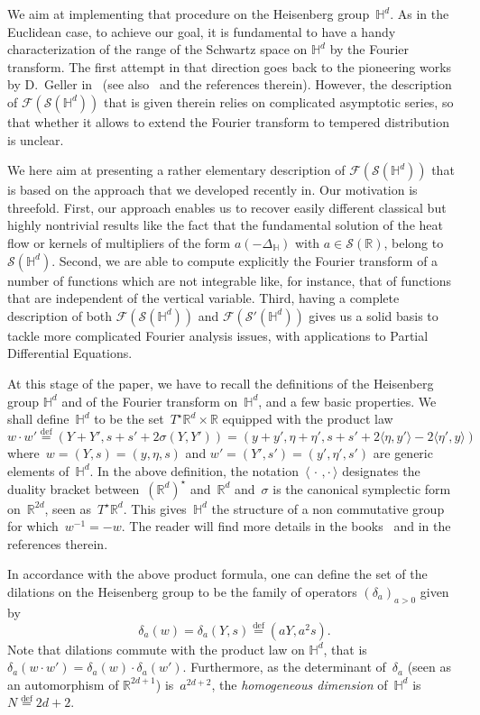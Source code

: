 \documentclass[11pt]{article}
\theoremstyle{definition}
\numberwithin{equation}{section}
\numberwithin{figure}{section}
\numberwithin{table}{section}
\newcommand{\D}{\Delta}
\newcommand*\cF{\mathcal{F}}
\newcommand*\cS{\mathcal{S}}
\newcommand*\R{\mathbb{R}}
\newcommand*\bbH{\mathbb{H}}
\newcommand*\eqdefa{\overset{\mathrm{def}}{=}}
\begin{document}
We aim at implementing that procedure on the Heisenberg group~$\bbH^d$. As in the Euclidean case, to achieve our goal, it is fundamental to have a handy characterization of the range of the Schwartz space on $\bbH^d$ by the Fourier transform. The first attempt in that direction goes back to the pioneering works by D.~Geller in~\cite{geller, geller2} (see also~\cite{astengo2,F,thangavelu2} and the references therein). However, the description of $\cF(\cS(\bbH^d))$ that is given therein relies on complicated asymptotic series, so that whether it allows to extend the Fourier transform to tempered distribution is unclear.

We here aim at presenting a rather elementary description of $\cF(\cS(\bbH^d))$ that is based on the approach that we developed recently in\cite{bcdFHspace}. Our motivation is threefold. First, our approach enables us to recover easily different classical but highly nontrivial results like the fact that the fundamental solution of the heat flow or kernels of multipliers of the form $a(-\D_\bbH)$ with $a\in\cS(\R)$, belong to $\cS(\bbH^d)$. Second, we are able to compute explicitly the Fourier transform of a number of functions which are not integrable like, for instance, that of functions that are independent of the vertical variable. Third, having a complete description of both $\cF(\cS(\bbH^d))$ and $\cF(\cS'(\bbH^d))$ gives us a solid basis to tackle more complicated Fourier analysis issues, with applications to Partial Differential Equations.

At this stage of the paper, we have to recall the definitions of the Heisenberg group $\bbH^d$ and of the Fourier transform on~$\bbH^d$, and a few basic properties. We shall define~$\bbH^d$ to be the set~$T^\star\R^d \times\R$ equipped with the product law
\[
w\cdot w'\eqdefa
\left(Y+Y', s+s'+ 2\sigma(Y,Y')\right) = \left(y+y', \eta+\eta', s+s'+2 \langle \eta,y'\rangle -2\langle \eta',y\rangle\right)
\]
where~$w=(Y,s)=(y,\eta,s)$ and $w'=(Y',s')=(y',\eta',s')$ are generic elements of~$\bbH^d$. In the above definition, the notation~$\langle{\,\cdot\,,\cdot\,}\rangle$ designates the duality bracket between~$(\R^d)^\star $ and~$\R^d$ and~$\sigma$ is the canonical symplectic form on~$\R^{2d}$, seen as~$T^\star\R^d$. This gives~$\bbH^d$ the structure of a non commutative group for which~$w^{-1}=-w$. The reader will find more details in the books~\cite{bfg, farautharzallah, fisher, folland, follandstein, stein2, taylor1, thangavelu} and in the references therein.

In accordance with the above product formula, one can define the set of the dilations on the Heisenberg group to be the family of operators $(\delta_a)_{a>0}$ given by
\begin{equation}\label{defdilations}
\delta_a(w) = \delta_a (Y,s) \eqdefa (aY,a^2s).
\end{equation}
Note that dilations commute with the product law on $\bbH^d$, that is $\delta_a(w\cdot w') = \delta_a(w) \cdot \delta_a (w')$. Furthermore, as the determinant of~$\delta_a$ (seen as an automorphism of $\R^{2d+1}$) is~$a^{2d+2}$, the \emph{homogeneous dimension} of~$\bbH^d$ is~$N\eqdefa2d+2$.
\end{document}
